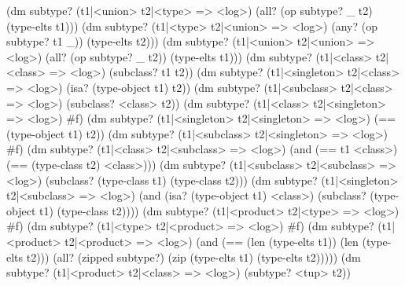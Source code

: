 \documentclass[twoside,twocolumn,9pt]{extarticle}
\begin{document}
\begin{exv}
(dm subtype? (t1|<union> t2|<type> => <log>)
  (all? (op subtype? _ t2) (type-elts t1)))
(dm subtype? (t1|<type> t2|<union> => <log>)
  (any? (op subtype? t1 _)) (type-elts t2)))
(dm subtype? (t1|<union> t2|<union> => <log>)
  (all? (op subtype? _ t2)) (type-elts t1)))
(dm subtype? (t1|<class> t2|<class> => <log>)
  (subclass? t1 t2))
(dm subtype? (t1|<singleton> t2|<class> => <log>)
  (isa? (type-object t1) t2))
(dm subtype? (t1|<subclass> t2|<class> => <log>)
  (subclass? <class> t2))
(dm subtype? (t1|<class> t2|<singleton> => <log>) #f)
(dm subtype? (t1|<singleton> t2|<singleton> => <log>)
  (== (type-object t1) t2))
(dm subtype? (t1|<subclass> t2|<singleton> => <log>) #f)
(dm subtype? (t1|<class> t2|<subclass> => <log>)
  (and (== t1 <class>) (== (type-class t2) <class>)))
(dm subtype? (t1|<subclass> t2|<subclass> => <log>)
  (subclass? (type-class t1) (type-class t2)))
(dm subtype? (t1|<singleton> t2|<subclass> => <log>)
  (and (isa? (type-object t1) <class>)
       (subclass? (type-object t1) (type-class t2))))
(dm subtype? (t1|<product> t2|<type> => <log>) #f)
(dm subtype? (t1|<type> t2|<product> => <log>) #f)
(dm subtype? (t1|<product> t2|<product> => <log>)
  (and (== (len (type-elts t1)) (len (type-elts t2)))
       (all? (zipped subtype?) (zip (type-elts t1) (type-elts t2)))))
(dm subtype? (t1|<product> t2|<class> => <log>)
  (subtype? <tup> t2))
\end{exv}
\end{document}
